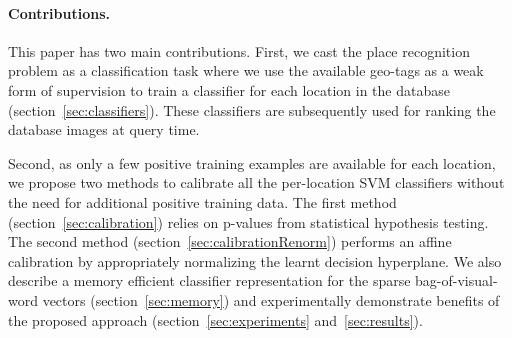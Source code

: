 \paragraph{Contributions.} 
  This paper has two main contributions. 
  {
    First, we cast the place recognition problem as a classification task where we use the available geo-tags as a weak form of supervision to train a classifier for each location in the database (section~\ref{sec:classifiers}).
    These classifiers are subsequently used for ranking the database images at query time.
  } 

  Second, as only a few positive training examples are available for each location, we propose two methods to calibrate all the per-location SVM classifiers without the need for additional positive training data. The first method (section~\ref{sec:calibration}) relies on p-values from statistical hypothesis testing. The second method (section~\ref{sec:calibrationRenorm}) performs an affine calibration by appropriately normalizing the learnt decision hyperplane. We also describe a memory efficient classifier representation for the sparse bag-of-visual-word vectors (section~\ref{sec:memory}) and  experimentally demonstrate benefits of the proposed approach (section~\ref{sec:experiments} and~\ref{sec:results}).  


